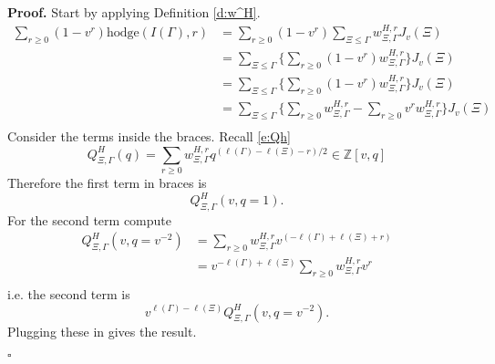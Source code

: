 \documentclass[12pt,leqno]{article}
\newcommand{\qed}{\hfill $\square$ \medskip}
\newenvironment{proof}[1][Proof]{\noindent\textbf{#1.} }{\qed}
\newcommand{\hodge}{\text{hodge}}
\newcommand{\mult}{\text{mult}}
\newcommand{\Z}{\mathbb Z}
\begin{document}
\begin{proof}
Start by applying Definition \ref{d:w^H}.
$$
\begin{aligned}
\sum_{r\ge 0}(1-v^r)\hodge(I(\Gamma),r)&=
\sum_{r\ge 0}(1-v^r)\sum_{\Xi\le\Gamma}w^{H,r}_{\Xi,\Gamma}J_v(\Xi)\\
&=\sum_{\Xi\le\Gamma}\big\{\sum_{r\ge 0}(1-v^r)w^{H,r}_{\Xi,\Gamma}\big\}J_v(\Xi)\\
&=\sum_{\Xi\le\Gamma}\big\{\sum_{r\ge 0}(1-v^r)w^{H,r}_{\Xi,\Gamma}\big\}J_v(\Xi)\\
&=\sum_{\Xi\le\Gamma}\big\{\sum_{r\ge 0}w^{H,r}_{\Xi,\Gamma}-\sum_{r\ge 0} v^rw^{H,r}_{\Xi,\Gamma}\big\}J_v(\Xi)\\
\end{aligned}
$$
Consider the terms inside the braces.
Recall \eqref{e:Qh}
$$
Q^H_{\Xi,\Gamma}(q)=\sum_{r\ge 0} w^{H,r}_{\Xi,\Gamma}q^{(\ell(\Gamma)-\ell(\Xi)-r)/2}\in \Z[v,q]
$$
Therefore the first term in braces is
$$
Q^H_{\Xi,\Gamma}(v,q=1).
$$
For the second term compute
\begin{equation}
\label{e:v^-2}
\begin{aligned}
Q^H_{\Xi,\Gamma}(v,q=v^{-2})&=\sum_{r\ge 0} w^{H,r}_{\Xi,\Gamma}v^{(-\ell(\Gamma)+\ell(\Xi)+r)}\\
&=v^{-\ell(\Gamma)+\ell(\Xi)}\sum_{r\ge 0} w^{H,r}_{\Xi,\Gamma}v^r\\
\end{aligned}
\end{equation}
i.e. the second term is
$$
v^{\ell(\Gamma)-\ell(\Xi)}Q^H_{\Xi,\Gamma}(v,q=v^{-2}).
$$
Plugging these in gives the result.



\end{proof}
\end{document}

